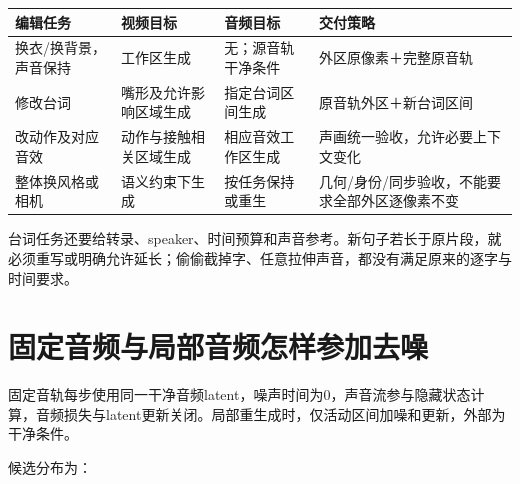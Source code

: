 {\def\LTcaptype{table} %
\small\setlength{\tabcolsep}{3pt}\renewcommand{\arraystretch}{1.18}
\begin{longtable}[]{@{}
  >{\raggedright\arraybackslash}p{}
  >{\raggedright\arraybackslash}p{}
  >{\raggedright\arraybackslash}p{}
  >{\raggedright\arraybackslash}p{}@{}}
\toprule\noalign{}
\begin{minipage}[b]{\linewidth}\raggedright
编辑任务
\end{minipage} & \begin{minipage}[b]{\linewidth}\raggedright
视频目标
\end{minipage} & \begin{minipage}[b]{\linewidth}\raggedright
音频目标
\end{minipage} & \begin{minipage}[b]{\linewidth}\raggedright
交付策略
\end{minipage} \\
\midrule\noalign{}
\endhead
\bottomrule\noalign{}
\endlastfoot
换衣/换背景，声音保持 & 工作区生成 & 无；源音轨干净条件 & 外区原像素＋完整原音轨 \\
修改台词 & 嘴形及允许影响区域生成 & 指定台词区间生成 & 原音轨外区＋新台词区间 \\
改动作及对应音效 & 动作与接触相关区域生成 & 相应音效工作区生成 & 声画统一验收，允许必要上下文变化 \\
整体换风格或相机 & 语义约束下生成 & 按任务保持或重生 & 几何/身份/同步验收，不能要求全部外区逐像素不变 \\
\end{longtable}
}

台词任务还要给转录、speaker、时间预算和声音参考。新句子若长于原片段，就必须重写或明确允许延长；偷偷截掉字、任意拉伸声音，都没有满足原来的逐字与时间要求。

\section{固定音频与局部音频怎样参加去噪}\label{seedance-m23-ux56faux5b9aux97f3ux9891ux4e0eux5c40ux90e8ux97f3ux9891ux600eux6837ux53c2ux52a0ux53bbux566a}

固定音轨每步使用同一干净音频latent，噪声时间为0，声音流参与隐藏状态计算，音频损失与latent更新关闭。局部重生成时，仅活动区间加噪和更新，外部为干净条件。

候选分布为：

